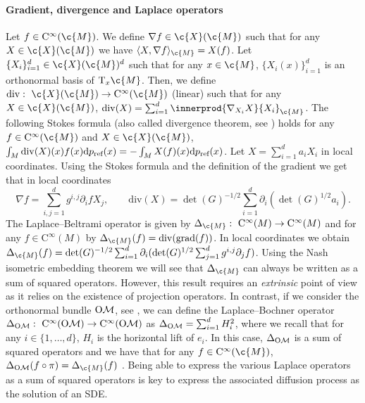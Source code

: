 \paragraph{Gradient, divergence and Laplace operators}
Let $f \in \mathrm{C}^{\infty}(\c{M})$.
We define $\nabla f \in \c{X}(\c{M})$ such that for any $X \in \c{X}(\c{M})$ we have $\langle X, \nabla f \rangle_{\c{M}} = X(f)$.
Let $\{X_i\}_{i=1}^d \in \c{X}(\c{M})^d$ such that for any $x \in \c{M}$, $\{X_i(x)\}_{i=1}^d$ is an orthonormal basis of $\mathrm{T}_x \c{M}$.
Then, we define $\mathrm{div}: \ \c{X}(\c{M}) \to \mathrm{C}^\infty(\c{M})$ (linear) such that for any $X \in \c{X}(\c{M})$, $\mathrm{div}(X) = \sum_{i=1}^d \innerprod{\nabla_{X_i}X}{X_i}_{\c{M}}$.
The following Stokes formula (also called divergence theorem, see \textcite[p.51]{lee2018introduction}) holds for any $f \in \mathrm{C}^\infty(\c{M})$ and $X \in \c{X}(\c{M})$, $\int_{M} \mathrm{div}(X)(x) f(x) \mathrm{d} p_{\textup{ref}}(x) = - \int_M X(f)(x) \mathrm{d} p_{\textup{ref}}(x)$.
Let $X = \sum_{i=1}^d a_i X_i$ in local coordinates.
Using the Stokes formula and the definition of the gradient we get that in local coordinates \begin{equation} \textstyle{ \nabla f = \sum_{i,j=1}^d g^{i,j} \partial_i f X_j , \qquad \mathrm{div}(X) = \det(G)^{-1/2} \sum_{i=1}^d \partial_i(\det(G)^{1/2} a_i) .
	}
\end{equation}
The Laplace--Beltrami operator is given by $\Delta_{\c{M}} : \ \mathrm{C}^\infty(M) \to \mathrm{C}^\infty(M)$ and for any $f \in \mathrm{C}^\infty(M)$ by $\Delta_{\c{M}}(f) = \mathrm{div}(\grad(f))$.
In local coordinates we obtain $\Delta_{\c{M}}(f) = \det(G)^{-1/2} \sum_{i=1}^d \partial_i (\det(G)^{1/2} \sum_{j=1}^d g^{i,j} \partial_j f)$.
Using the Nash isometric embedding theorem \parencite{gunther1991isometric} we will see that $\Delta_{\c{M}}$ can always be written as a sum of squared operators.
However, this result requires an \emph{extrinsic} point of view as it relies on the existence of projection operators.
In contrast, if we consider the orthonormal bundle $\mathrm{O}\mathcal{M}$, see \cite[Chapter 2]{hsu2002stochastic}, we can define the Laplace--Bochner operator $\Delta_{\OM}: \ \mathrm{C}^\infty(\OM) \to \mathrm{C}^\infty(\OM)$ as $\Delta_{\mathrm{O}\mathcal{M}} = \sum_{i=1}^d H_i^2$, where we recall that for any $i \in \{1, \dots, d\}$, $H_i$ is the horizontal lift of $e_i$.
In this case, $\Delta_{\mathrm{O}\mathcal{M}}$ is a sum of squared operators and we have that for any $f \in \mathrm{C}^\infty(\c{M})$, $\Delta_{\OM}(f \circ \pi) = \Delta_{\c{M}}(f)$ \cite[see][Proposition 3.1.2]{hsu2002stochastic}.
Being able to express the various Laplace operators as a sum of squared operators is key to express the associated diffusion process as the solution of an SDE.

